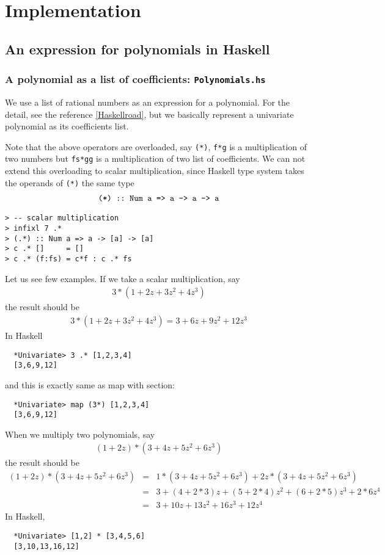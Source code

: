 \documentclass[11pt]{book}
\begin{document}

\chapter{Implementation}
\section{An expression for polynomials in Haskell}
\subsection{A polynomial as a list of coefficients: \texttt{Polynomials.hs}}
We use a list of rational numbers as an expression for a polynomial.
For the detail, see the reference \ref{Haskellroad}, but we basically represent a univariate polynomial as its coefficients list.



Note that the above operators are overloaded, say \texttt{(*)}, \texttt{f*g} is a multiplication of two numbers but \texttt{fs*gg} is a multiplication of two list of coefficients.
We can not extend this overloading to scalar multiplication, since Haskell type system takes the operands of \texttt{(*)} the same type
\begin{eqnarray}
\verb+(*) :: Num a => a -> a -> a+
\end{eqnarray}

\begin{verbatim}
> -- scalar multiplication
> infixl 7 .*
> (.*) :: Num a => a -> [a] -> [a]
> c .* []     = []
> c .* (f:fs) = c*f : c .* fs
\end{verbatim}
Let us see few examples.
If we take a scalar multiplication, say
\begin{eqnarray}
3 * \left( 1+2z+3z^2+4z^3\right)
\end{eqnarray}
the result should be
\begin{eqnarray}
3 * \left( 1+2z+3z^2+4z^3\right)
=
3+6z+9z^2+12z^3
\end{eqnarray}
In Haskell 
\begin{verbatim}
  *Univariate> 3 .* [1,2,3,4]
  [3,6,9,12]
\end{verbatim}
and this is exactly same as map with section:
\begin{verbatim}
  *Univariate> map (3*) [1,2,3,4]
  [3,6,9,12]
\end{verbatim}
When we multiply two polynomials, say
\begin{eqnarray}
(1+2z) * (3+4z+5z^2+6z^3)
\end{eqnarray}
the result should be
\begin{eqnarray}
\nonumber
(1+2z) * (3+4z+5z^2+6z^3)
&=& 1*(3+4z+5z^2+6z^3) + 2z*(3+4z+5z^2+6z^3) \\
\nonumber
&=& 3+(4+2*3)z+(5+2*4)z^2+(6+2*5)z^3 + 2*6 z^4 \\
&=& 3+ 10z + 13z^2 + 16 z^3 + 12 z^4 
\end{eqnarray}
In Haskell,
\begin{verbatim}
  *Univariate> [1,2] * [3,4,5,6]
  [3,10,13,16,12]
\end{verbatim}
\end{document}
